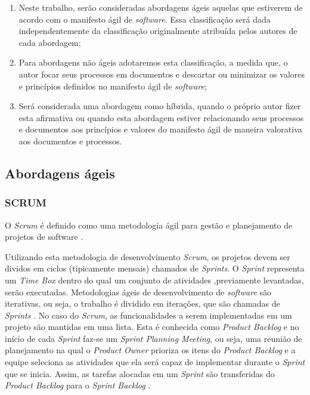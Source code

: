 \documentclass{acm_proc_article-sp}
\begin{document}
\begin{enumerate}
\item  Neste trabalho, serão consideradas abordagens ágeis aquelas que estiverem de acordo com o manifesto ágil de \textit{software}. Essa classificação será dada independentemente da classificação originalmente atribuída pelos autores de cada abordagem;
\item Para abordagens não ágeis adotaremos esta classificação, a medida que, o autor focar seus processos em documentos e descartar ou minimizar os valores e princípios definidos no manifesto ágil de \textit{software};
\item Será considerada uma abordagem como híbrida, quando o próprio autor fizer esta afirmativa ou quando esta abordagem estiver relacionando seus processos e documentos aos princípios e valores do manifesto ágil de maneira valorativa aos documentos e processos.
\end{enumerate}

\subsection{Abordagens ágeis}

\subsubsection{SCRUM}
O \textit{Scrum} é definido como uma metodologia ágil para gestão e planejamento de projetos de software \cite{scrum:agil}.

Utilizando esta metodologia de desenvolvimento \textit{Scrum}, os projetos devem ser dividos em ciclos (tipicamente mensais) chamados de \textit{Sprints}. O \textit{Sprint} representa um \textit{Time Box} dentro do qual um conjunto de atividades ,previamente levantadas, serão executadas. Metodologias ágeis de desenvolvimento de \textit{software} são iterativas, ou seja, o trabalho é dividido em iterações, que são chamadas de \textit{Sprints} \cite{scrum:agil}. No caso do \textit{Scrum}, as funcionalidades a serem implementadas em um projeto são mantidas em uma lista. Esta é conhecida como \textit{Product Backlog} e no início de cada \textit{Sprint} faz-se um \textit{Sprint Planning Meeting}, ou seja, uma reunião de planejamento na qual o \textit{Product Owner} prioriza os itens do \textit{Product Backlog} e a equipe seleciona as atividades que ela será capaz de implementar durante o \textit{Sprint} que se inicia. Assim, as tarefas alocadas em um \textit{Sprint} são transferidas do \textit{Product Backlog} para o \textit{Sprint Backlog} \cite{scrum:agil}.
\end{document}
